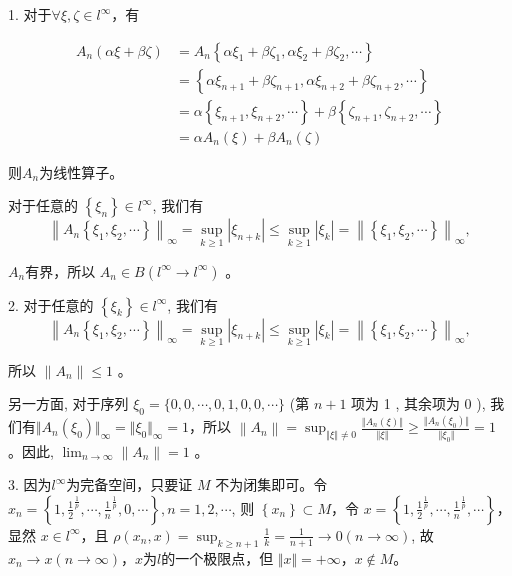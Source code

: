 \documentclass{article}
\begin{document}
\begin{enumerate}
1. 对于$\forall \xi, \zeta \in l^{\infty}$，有

\begin{equation*}
    \begin{aligned}
        A_n(\alpha \xi + \beta \zeta) &= A_n\left\{\alpha \xi_{1} + \beta \zeta_{1}, \alpha \xi_{2} + \beta \zeta_{2},\cdots\right\}\\
        &= \left\{\alpha \xi_{n+1} + \beta \zeta_{n+1}, \alpha \xi_{n+2} + \beta \zeta_{n+2},\cdots\right\}\\
        &=\alpha\left\{\xi_{n+1}, \xi_{n+2}, \cdots\right\} + \beta\left\{\zeta_{n+1}, \zeta_{n+2}, \cdots\right\}\\
        &=\alpha A_n(\xi) + \beta A_n(\zeta)
    \end{aligned}
\end{equation*}

则$A_n$为线性算子。

对于任意的 $\left\{\xi_n\right\} \in l^{\infty}$, 我们有
$$
\left\|A_n\left\{\xi_1, \xi_2, \cdots\right\}\right\|_{\infty}=\sup _{k \geq 1}\left|\xi_{n+k}\right| \leq \sup _{k \geq 1}\left|\xi_k\right|=\left\|\left\{\xi_1, \xi_2, \cdots\right\}\right\|_{\infty},
$$

$A_n$有界，所以 $A_n \in B\left(l^{\infty} \rightarrow l^{\infty}\right)$ 。

2. 对于任意的 $\left\{\xi_k\right\} \in l^{\infty}$, 我们有
$$
\left\|A_n\left\{\xi_1, \xi_2, \cdots\right\}\right\|_{\infty}=\sup _{k \geq 1}\left|\xi_{n+k}\right| \leq \sup _{k \geq 1}\left|\xi_k\right|=\left\|\left\{\xi_1, \xi_2, \cdots\right\}\right\|_{\infty},
$$

所以 $\left\|A_n\right\| \leq 1$ 。

另一方面, 对于序列 $\xi_0=\{0,0, \cdots, 0,1,0,0, \cdots\}$ (第 $n+1$ 项为 1 , 其余项为 0 ), 我们有$\Vert A_n(\xi_0) \Vert_{\infty} = \Vert \xi_0 \Vert_{\infty} = 1$，所以 $\left\|A_n\right\| = \sup_{\Vert \xi \Vert \neq 0}\frac{\Vert A_n(\xi)\Vert}{\Vert \xi \Vert}\geq \frac{\Vert A_n(\xi_0)\Vert}{\Vert \xi_0 \Vert} = 1$ 。因此, $\lim _{n \rightarrow \infty}\left\|A_n\right\|=1$ 。

3. 因为$l^{\infty}$为完备空间，只要证 $M$ 不为闭集即可。令 $x_n=\left\{1, {\frac{1}{2}}^{\frac{1}{p}}, \cdots, {\frac{1}{n}}^{\frac{1}{p}}, 0, \cdots\right\}, n=1,2, \cdots$, 则 $\left\{x_n\right\} \subset M$，令 $x=\left\{1, {\frac{1}{2}}^{\frac{1}{p}}, \cdots, {\frac{1}{n}}^{\frac{1}{p}}, \cdots\right\}$，显然 $x \in l^{\infty}$，且 $\rho\left(x_n, x\right)=\sup_{k \geq n+1} \frac{1}{k}=\frac{1}{n+1} \rightarrow 0(n \rightarrow \infty)$, 故 $x_n \rightarrow x(n \rightarrow \infty)$，$x$为$l$的一个极限点，但 $\Vert x \Vert = +\infty$，$x \notin M$。


\end{enumerate}
\end{document}
